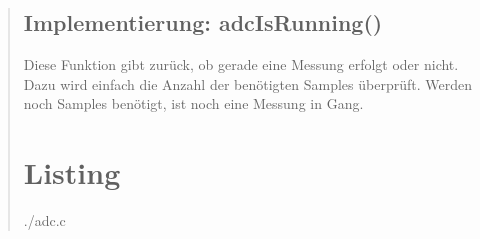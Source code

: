 \begin{quote}
\subsection{Implementierung: adcIsRunning()}
Diese Funktion gibt zurück, ob gerade eine Messung erfolgt oder nicht. Dazu wird einfach die Anzahl der benötigten Samples überprüft. Werden noch Samples benötigt, ist noch eine Messung in Gang.


\section{Listing}

        {./adc.c}

  
\end{quote}





